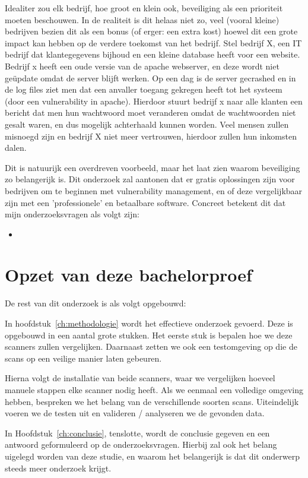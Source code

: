 
Idealiter zou elk bedrijf, hoe groot en klein ook, beveiliging als een prioriteit moeten beschouwen. In de realiteit is dit helaas niet zo, veel (vooral kleine) bedrijven bezien dit als een bonus (of erger: een extra kost) hoewel dit een grote impact kan hebben op de verdere toekomst van het bedrijf. Stel bedrijf X, een IT bedrijf dat klantegegevens bijhoud en een kleine database heeft voor een website. Bedrijf x heeft een oude versie van de apache webserver, en deze wordt niet geüpdate omdat de server blijft werken. Op een dag is de server gecrashed en in de log files ziet men dat een anvaller toegang gekregen heeft tot het systeem (door een vulnerability in apache). Hierdoor stuurt bedrijf x naar alle klanten een bericht dat men hun wachtwoord moet veranderen omdat de wachtwoorden niet gesalt waren, en dus mogelijk achterhaald kunnen worden. Veel mensen zullen misnoegd zijn en bedrijf X niet meer vertrouwen, hierdoor zullen hun inkomsten dalen.


Dit is natuurijk een overdreven voorbeeld, maar het laat zien waarom beveiliging zo belangerijk is. Dit onderzoek zal aantonen dat er gratis oplossingen zijn voor bedrijven om te beginnen met vulnerability management, en of deze vergelijkbaar zijn met een 'professionele' en betaalbare software. Concreet betekent dit dat mijn onderzoeksvragen als volgt zijn:

\begin{itemize}
\item 
\end{itemize}


\section{Opzet van deze bachelorproef}
\label{sec:opzet-bachelorproef}

De rest van dit onderzoek is als volgt opgebouwd:

In hoofdstuk~\ref{ch:methodologie} wordt het effectieve onderzoek gevoerd. Deze is opgebouwd in een aantal grote stukken. Het eerste stuk is bepalen hoe we deze scanners zullen vergelijken. Daarnaast zetten we ook een testomgeving op die de scans op een veilige manier laten gebeuren. 

Hierna volgt de installatie van beide scanners, waar we vergelijken hoeveel manuele stappen elke scanner nodig heeft. Als we eenmaal een volledige omgeving hebben, bespreken we het belang van de verschillende soorten scans. Uiteindelijk voeren we de testen uit en valideren / analyseren we de gevonden data.

In Hoofdstuk~\ref{ch:conclusie}, tenslotte, wordt de conclusie gegeven en een antwoord geformuleerd op de onderzoeksvragen. Hierbij zal ook het belang uigelegd worden van deze studie, en waarom het belangerijk is dat dit onderwerp steeds meer onderzoek krijgt.

